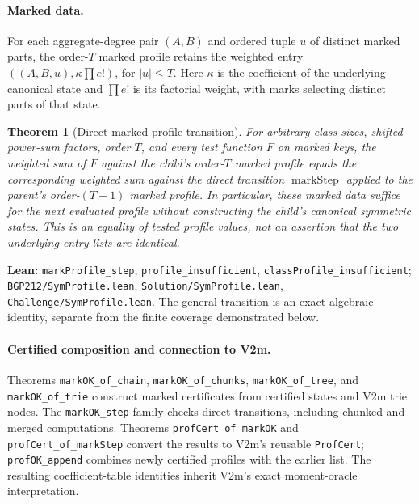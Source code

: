 \documentclass[11pt]{article}
\newtheorem{theorem}{Theorem}[section]
\newcommand{\code}[1]{\texttt{#1}}
\begin{document}
\paragraph{Marked data.}
For each aggregate-degree pair $(A,B)$ and ordered tuple $u$ of distinct
marked parts, the order-$T$ marked profile retains the weighted entry
$((A,B,u),\kappa\prod e!)$, for $|u|\le T$. Here $\kappa$ is the
coefficient of the underlying canonical state and $\prod e!$ is its
factorial weight, with marks selecting distinct parts of that state.

\begin{theorem}[Direct marked-profile transition]\label{thm:v2n-step}
For arbitrary class sizes, shifted-power-sum factors, order $T$, and every
test function $F$ on marked keys, the weighted sum of $F$ against the
child's order-$T$ marked profile equals the corresponding weighted sum
against the direct transition $\operatorname{markStep}$ applied to the
parent's order-$(T+1)$ marked profile. In particular, these marked data
suffice for the next evaluated profile without constructing the child's
canonical symmetric states. This is an equality of tested profile values,
not an assertion that the two underlying entry lists are identical.
\end{theorem}
\noindent\textbf{Lean:} \code{markProfile\_step},
\code{profile\_insufficient}, \code{classProfile\_insufficient};
\nolinkurl{BGP212/SymProfile.lean},
\nolinkurl{Solution/SymProfile.lean},
\nolinkurl{Challenge/SymProfile.lean}.
The general transition is an exact algebraic identity, separate from the
finite coverage demonstrated below.

\paragraph{Certified composition and connection to V2m.}
Theorems \code{markOK\_of\_chain}, \code{markOK\_of\_chunks},
\code{markOK\_of\_tree}, and \code{markOK\_of\_trie} construct marked
certificates from certified states and V2m trie nodes. The
\code{markOK\_step} family checks direct transitions, including chunked
and merged computations. Theorems \code{profCert\_of\_markOK} and
\code{profCert\_of\_markStep} convert the results to V2m's reusable
\code{ProfCert}; \code{profOK\_append} combines newly certified profiles
with the earlier list. The resulting coefficient-table identities inherit
V2m's exact moment-oracle interpretation.
\end{document}
